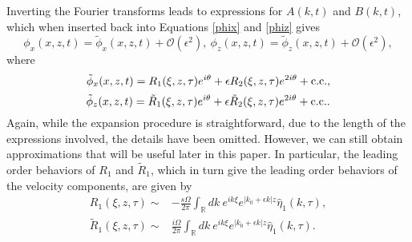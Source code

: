 \documentclass{JFM_Style/jfm}
\begin{document}
Inverting the Fourier transforms leads to expressions for $A(k,t)$ and $B(k,t)$, which when inserted back into Equations \eqref{phix} and \eqref{phiz} gives
\[
\phi_{x}(x,z,t) = \tilde{\phi}_{x}(x,z,t) + \mathcal{O}(\epsilon^{2}), ~ \phi_{z}(x,z,t) = \tilde{\phi}_{z}(x,z,t) + \mathcal{O}(\epsilon^{2}),
\]
where
\begin{equation}
\tilde{\phi}_{x}(x,z,t) = R_{1}(\xi,z,\tau)e^{i\theta} \\+ \epsilon R_{2}(\xi,z,\tau)e^{2i\theta} + \mbox{c.c.},
\label{phixexp}
\end{equation}
\begin{equation}
\tilde{\phi}_{z}(x,z,t) =  \tilde{R}_{1}(\xi,z,\tau)e^{i\theta} \\+ \epsilon \tilde{R}_{2}(\xi,z,\tau)e^{2i\theta} + \mbox{c.c.}.
\label{phizexp}
\end{equation}
Again, while the expansion procedure is straightforward, due to the length of the expressions involved, the details have been omitted.  However, we can still obtain approximations that will be useful later in this paper.  In particular, the leading order behaviors of $R_{1}$ and $\tilde{R}_{1}$, which in turn give the leading order behaviors of the velocity components, are given by
\begin{align}
R_{1}(\xi,z,\tau) \sim & -\frac{s\Omega}{2\pi}\int_{\mathbb{R}} dk ~ e^{i k \xi} e^{|k_{0}+\epsilon k|z}\hat{\eta}_{1}(k,\tau), \label{roeqx}\\
\tilde{R}_{1}(\xi,z,\tau) \sim & \frac{i\Omega}{2\pi}\int_{\mathbb{R}} dk ~ e^{i k \xi} e^{|k_{0}+\epsilon k|z}\hat{\eta}_{1}(k,\tau).
\label{roeqz}
\end{align}

\end{document}
